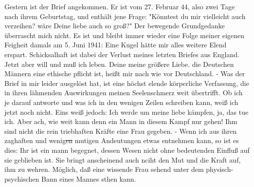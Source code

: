\def\day{16. Mai 1944.}
\mktitle

Gestern ist der Brief angekommen.
Er ist vom 27. Februar 44, also zwei Tage nach ihrem Geburtstag, und enth\"{a}lt jene Frage: "K\"{o}nntest du mir vielleicht auch verzeihen? w\"{a}re Deine liebe auch so gro{\ss}?"
Der bewegende Grundgedanke \"{u}berrascht mich nicht.
Es ist und bleibt immer wieder eine Folge meiner eigenen Feigheit damals am 5. Juni 1941: Eine Kugel h\"{a}tte mir alles weitere Elend erspart.
Schicksalhaft ist dabei der Verlust meines letzten Briefes aus England.
Jetzt aber will und mu{\ss} ich leben.
Deine meine gr\"{o}{\ss}ere Liebe. die Deutschen M\"{a}nnern eine ethische pflicht ist, hei{\ss}t mir nach wie vor Deutschland.
- Was der Brief in mir leider ausgel\"{o}st hat, ist eine h\"{o}chst elende k\"{o}rperliche Verfassung, die in ihren l\"{a}hmenden Auswirkungen meinen Seelenschmerz weit \"{u}bertrifft.
Ob ich je darauf antworte und was ich in den wenigen Zeilen schreiben kann, wei{\ss} ich jetzt noch nicht.
Eins wei{\ss} jedoch: Ich werde um meine liebe k\"{a}mpfen, ja, das tue ich.
Aber ach, wie weit kann denn ein Mann in diesem Kampf nur gehen!
Ihm sind nicht die rein triebhaften Kr\"{a}fte eine Frau gegeben.
- Wenn ich aus ihren zaghaften und wenig\st{en}
mutigen Andeutungen etwas entnehmen kann, so ist es dies: Ihr ist ein mann begegnet, dessen Wesen nicht ohne bedeutenden Einflu{\ss} auf sie geblieben ist.
Sie bringt anscheinend auch nciht den Mut und die Kraft auf, ihm zu wehren.
M\"{o}glich, da{\ss} eine wissende Frau sehend unter dem physisch-psychischen Bann eines Mannes sthen kann.

\clearpage
